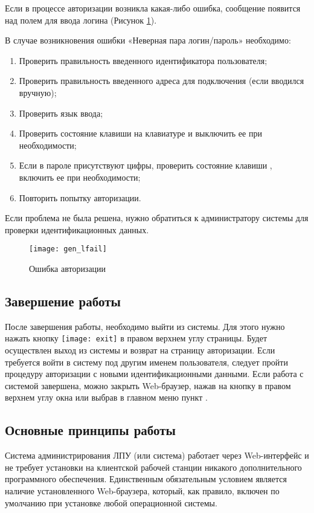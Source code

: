 Если в процессе авторизации возникла какая-либо ошибка, сообщение появится над полем для ввода логина (Рисунок \ref{img_gen_lfail}).

В случае возникновения ошибки «Неверная пара логин/пароль» необходимо:
\begin{enumerate}
 \item Проверить правильность введенного идентификатора пользователя;
 \item Проверить правильность введенного адреса для подключения (если вводился вручную);
 \item Проверить язык ввода;
 \item Проверить состояние клавиши  на клавиатуре и выключить ее при необходимости;
 \item Если в пароле присутствуют цифры, проверить состояние клавиши , включить ее при необходимости;
 \item Повторить попытку авторизации.
\end{enumerate}
 
Если проблема не была решена, нужно обратиться к администратору системы для проверки идентификационных данных.

\begin{figure}[ht]\centering
 \texttt{[image: gen\_lfail]}
 \caption{Ошибка авторизации}
 \label{img_gen_lfail}
\end{figure} 

\subsection{Завершение работы}

После завершения работы, необходимо выйти из системы. Для этого нужно нажать кнопку \texttt{[image: exit]} в правом верхнем углу страницы. Будет осуществлен выход из системы и возврат на страницу авторизации. Если требуется войти в систему под другим именем пользователя, следует пройти процедуру авторизации с новыми идентификационными данными. Если работа с системой завершена, можно закрыть Web-браузер, нажав на кнопку  в правом верхнем углу окна или выбрав в главном меню пункт .

\subsection{Основные принципы работы}

Система администрирования ЛПУ (или система) работает через Web-интерфейс и не требует установки на клиентской рабочей станции никакого дополнительного программного обеспечения. Единственным обязательным условием является наличие установленного Web-браузера, который, как правило, включен по умолчанию при установке любой операционной системы.

